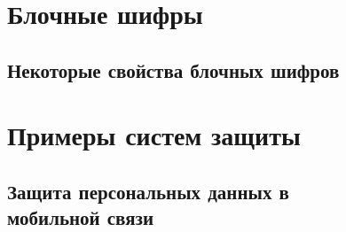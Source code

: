 





\chapter{Блочные шифры}\label{chapter-block-ciphers}

















\section{Некоторые свойства блочных шифров}






















\chapter{Примеры систем защиты}









\section[Защита персональных данных в мобильной связи]{Защита персональных данных в \protect\\ мобильной связи}

